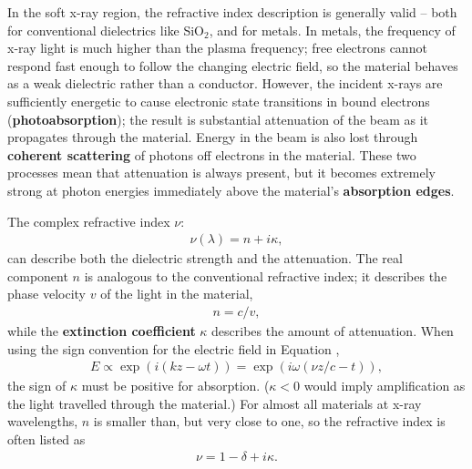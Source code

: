 In the soft x-ray region, the refractive index description is generally valid -- both for conventional dielectrics like SiO$_2$, and for metals.  In metals, the frequency of x-ray light is much higher than the plasma frequency; free electrons cannot respond fast enough to follow the changing electric field, so the material behaves as a weak dielectric rather than a conductor.  However, the incident x-rays are sufficiently energetic to cause electronic state transitions in bound electrons (\textbf{photoabsorption}); the result is substantial attenuation of the beam as it propagates through the material.  Energy in the beam is also lost through \textbf{coherent scattering} of photons off electrons in the material.  These two processes mean that attenuation is always present, but it becomes extremely strong at photon energies immediately above the material's \textbf{absorption edges}.

The complex refractive index $\nu$:
\begin{align}
\nu(\lambda) = n + i \kappa,
\end{align}
can describe both the dielectric strength and the attenuation.  The real component $n$ is analogous to the conventional refractive index; it describes the phase velocity $v$ of the light in the material,
\begin{align}
n = c / v,
\end{align}
while the \textbf{extinction coefficient }$\kappa$ describes the amount of attenuation.  When using the sign convention for the electric field in Equation ,
\begin{align}
E \propto \exp(i(kz - \omega t)) = \exp(i \omega(\nu z/c - t)),
\end{align}
the sign of $\kappa$ must be positive for absorption.  ($\kappa < 0$ would imply amplification as the light travelled through the material.)
For almost all materials at x-ray wavelengths, $n$ is smaller than, but very close to one, so the refractive index is often listed as
\begin{align}
\nu = 1 - \delta + i \kappa.
\end{align}

